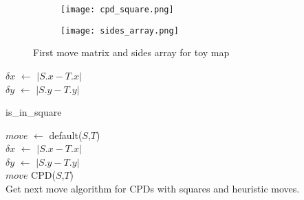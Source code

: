 \begin{figure}[h]
      \centering
      \begin{subfigure}{.35\columnwidth}
      \centering
      \texttt{[image: cpd\_square.png]}
        \caption{}
        \label{fig:results_1}
      \end{subfigure}%
      \begin{subfigure}{.35\columnwidth}
      \texttt{[image: sides\_array.png]}
      \centering
        \caption{}
        \label{fig:results_2}
      \end{subfigure}
      \caption{\small First move matrix and sides array for toy map}
      \label{fig:results}
    \end{figure}




\begin{algorithm}
$\delta x$ $\gets$ $|S.x - T.x|$\\
$\delta y$ $\gets$ $|S.y - T.y|$\\
\caption{is\_in\_square}\label{alg:1}
\end{algorithm}

 

\begin{algorithm}
$move$ $\gets$ \textsf{default}($S$,$T$) \\
$\delta x$ $\gets$ $|S.x - T.x|$\\
$\delta y$ $\gets$ $|S.y - T.y|$\\
   {\Return $move$}
\Return \textsf{CPD}($S$,$T$) \\ 
\caption{Get next move algorithm for CPDs with squares and heuristic moves.}
\label{alg:2}
\end{algorithm}

 
